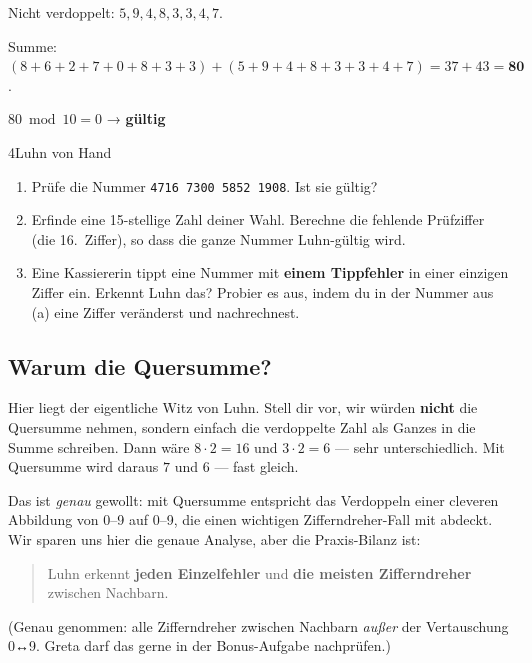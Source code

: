 Nicht verdoppelt: $5, 9, 4, 8, 3, 3, 4, 7$.

Summe: $(8+6+2+7+0+8+3+3) + (5+9+4+8+3+3+4+7) = 37 + 43 = \mathbf{80}$.

$80 \bmod 10 = 0$ → \textbf{gültig} \checkmark

\begin{bleistiftuebung}{4}{Luhn von Hand}
\begin{enumerate}[label=(\alph*), leftmargin=*]
\item Prüfe die Nummer \texttt{4716 7300 5852 1908}. Ist sie gültig?
\item Erfinde eine 15-stellige Zahl deiner Wahl. Berechne die fehlende
  Prüfziffer (die 16.\ Ziffer), so dass die ganze Nummer Luhn-gültig
  wird.
\item Eine Kassiererin tippt eine Nummer mit \textbf{einem
  Tippfehler} in einer einzigen Ziffer ein. Erkennt Luhn das? Probier
  es aus, indem du in der Nummer aus (a) eine Ziffer veränderst und
  nachrechnest.
\end{enumerate}
\end{bleistiftuebung}

\subsection*{Warum die Quersumme?}

Hier liegt der eigentliche Witz von Luhn. Stell dir vor, wir würden
\textbf{nicht} die Quersumme nehmen, sondern einfach die verdoppelte
Zahl als Ganzes in die Summe schreiben. Dann wäre $8 \cdot 2 = 16$
und $3 \cdot 2 = 6$ — sehr unterschiedlich. Mit Quersumme wird daraus
$7$ und $6$ — fast gleich.

Das ist \emph{genau} gewollt: mit Quersumme entspricht das Verdoppeln
einer cleveren Abbildung von 0–9 auf 0–9, die einen wichtigen
Zifferndreher-Fall mit abdeckt. Wir sparen uns hier die genaue
Analyse, aber die Praxis-Bilanz ist:

\begin{quote}
Luhn erkennt \textbf{jeden Einzelfehler} und \textbf{die meisten
Zifferndreher} zwischen Nachbarn.
\end{quote}

(Genau genommen: alle Zifferndreher zwischen Nachbarn \emph{außer}
der Vertauschung 0↔9. Greta darf das gerne in der Bonus-Aufgabe
nachprüfen.)

